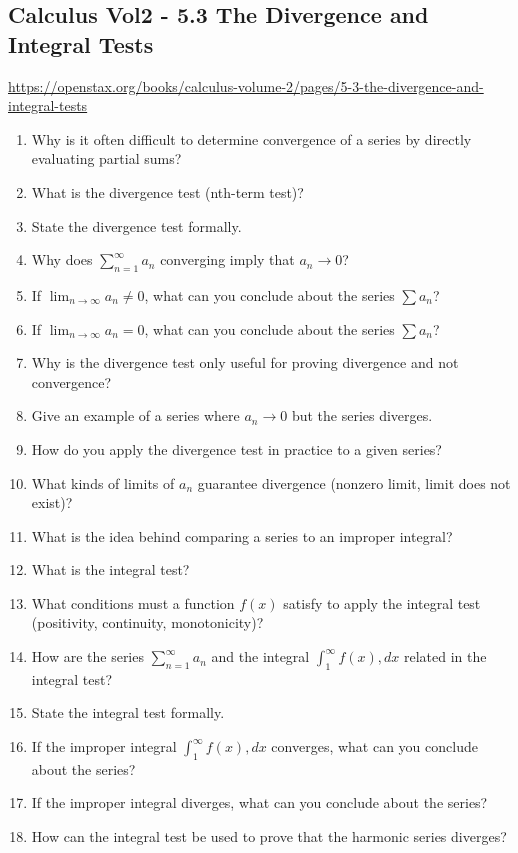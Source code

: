 \subsection{Calculus Vol2 - 5.3 The Divergence and Integral Tests}

\url{https://openstax.org/books/calculus-volume-2/pages/5-3-the-divergence-and-integral-tests}

\begin{enumerate}
  \item Why is it often difficult to determine convergence of a series by directly evaluating partial sums?
  \item What is the divergence test (nth-term test)?
  \item State the divergence test formally.
  \item Why does $\sum_{n=1}^{\infty} a_n$ converging imply that $a_n \to 0$?
  \item If $\lim_{n\to\infty} a_n \neq 0$, what can you conclude about the series $\sum a_n$?
  \item If $\lim_{n\to\infty} a_n = 0$, what can you conclude about the series $\sum a_n$?
  \item Why is the divergence test only useful for proving divergence and not convergence?
  \item Give an example of a series where $a_n \to 0$ but the series diverges.
  \item How do you apply the divergence test in practice to a given series?
  \item What kinds of limits of $a_n$ guarantee divergence (nonzero limit, limit does not exist)?
  \item What is the idea behind comparing a series to an improper integral?
  \item What is the integral test?
  \item What conditions must a function $f(x)$ satisfy to apply the integral test (positivity, continuity, monotonicity)?
  \item How are the series $\sum_{n=1}^{\infty} a_n$ and the integral $\int_1^\infty f(x),dx$ related in the integral test?
  \item State the integral test formally.
  \item If the improper integral $\int_1^\infty f(x),dx$ converges, what can you conclude about the series?
  \item If the improper integral diverges, what can you conclude about the series?
  \item How can the integral test be used to prove that the harmonic series diverges?

\end{enumerate}
